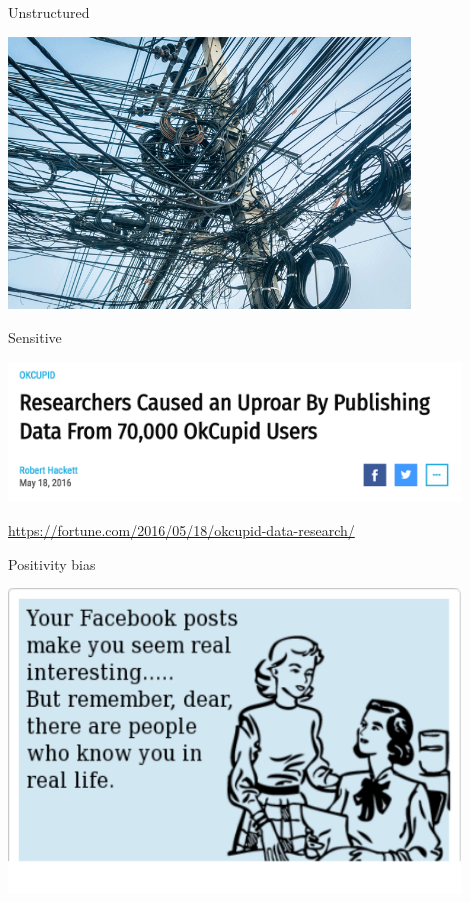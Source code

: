 \documentclass{beamer}
\def\vf{\vfill}
\begin{document}
\begin{frame}{Unstructured}

\begin{center}
	\includegraphics[width=0.8\textwidth]{figures/The-Dirty-Little-Secret-of-Big-Data.png}
	
\end{center}

\end{frame}

\begin{frame}{Sensitive}

\begin{center}
	\includegraphics[width=0.9\textwidth]{figures/ok_cupid.png}
	
\end{center}
\vf
\tiny{\url{https://fortune.com/2016/05/18/okcupid-data-research/}}


\end{frame}


\begin{frame}{Positivity bias}

\begin{center}
	\includegraphics[width=0.9\textwidth]{figures/facebook_positivity_bias.png}
	
\end{center}

\end{frame}
\end{document}
